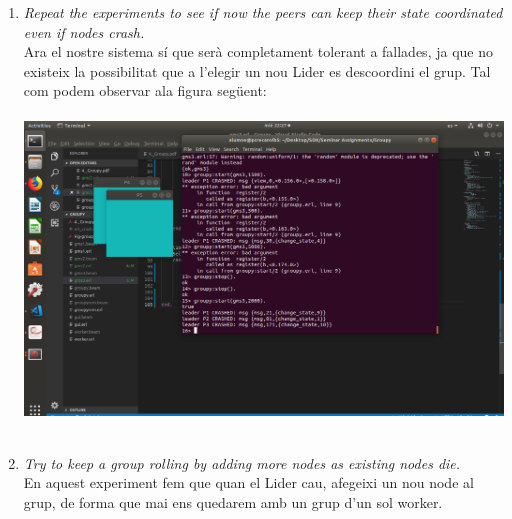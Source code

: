 \documentclass[a4paper, 10pt]{article}
\begin{document}
\begin{enumerate}
    \item \textit{ Repeat the experiments to see if now the peers can keep their state coordinated even if nodes crash.}\\
    Ara el nostre sistema sí que serà completament tolerant a fallades, ja que no existeix la possibilitat que a l'elegir un nou Lider es descoordini el grup. Tal com podem observar ala figura següent:\\\\
        \includegraphics[width=\textwidth]{img6.png}\\\\

 \item \textit{ Try to keep a group rolling by adding more nodes as existing nodes die.}\\
 En aquest experiment fem que quan el Lider cau, afegeixi un nou node al grup, de forma que mai ens quedarem amb un grup d'un sol worker.
\end{enumerate}
\end{document}
